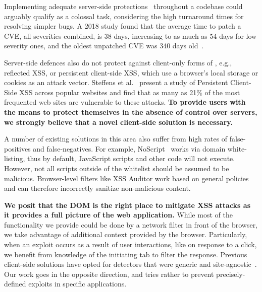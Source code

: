 Implementing adequate server-side protections~\cite{Xu:2006:TPE:1267336.1267345,DBLP:conf/sec/Nguyen-TuongGGSE05,Pietraszek:2005:DAI:2146257.2146267,Bisht:2008:XPD:1428322.1428325} throughout a codebase could arguably qualify as a colossal task, considering the high turnaround times for resolving simpler bugs. A 2018 study found that the average time to patch a \ac{CVE}, all severities combined, is 38 days, increasing to as much as 54 days for low severity ones, and the oldest unpatched \ac{CVE} was 340
days old~\cite{Rapid7}.



Server-side defences also do not protect against client-only forms of
\xss, e.g., reflected \ac{XSS}, or persistent
client-side \ac{XSS}, which use a browser's local storage or cookies
as an attack vector. Steffens et
al.~\cite{DBLP:conf/ndss/SteffensRJS19} present a study of Persistent
Client-Side \ac{XSS} across popular websites and find that as many as
21\% of the most frequented web sites are vulnerable to these attacks.
%
\textbf{To provide users with the means to protect themselves in the absence
of control over servers, we strongly believe that a novel client-side
solution is necessary.}

A number of existing solutions in this area also suffer from high
rates of false-positives and false-negatives. %
For example, NoScript~\cite{Noscript} works via domain white-listing, thus by
default, JavaScript scripts and other code will not execute. However,
not all scripts outside of the whitelist should be assumed to be
malicious. Browser-level filters like XSS Auditor work based on
general policies and can therefore incorrectly sanitize non-malicious
content.

\textbf{We posit that the DOM is the right place to mitigate XSS
  attacks as it provides a full picture of the web application.} While
most of the functionality we provide could be done by a network filter
in front of the browser, we take advantage of additional context
provided by the browser.
%
Particularly, when an exploit occurs as a result of user interactions,
like on response to a click, we
benefit from knowledge of the initiating tab to filter the
response. Previous client-side solutions have opted for detectors that were generic and site-agnostic~\cite{Kirda:2009:CCS:2639535.2639808,Jim:2007:DSI:1242572.1242654,Hallaraker:2005:DMJ:1078029.1078861}. Our work goes in the opposite direction, and tries rather to prevent precisely-defined exploits in specific applications.

